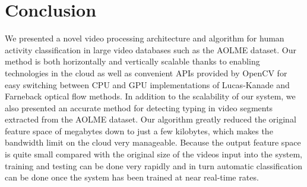\section{Conclusion}
We presented a novel video processing architecture and algorithm for human
activity classification in large video databases such as the AOLME dataset. Our
method is both horizontally and vertically scalable thanks to enabling
technologies in the cloud as well as convenient APIs provided by OpenCV for easy
switching between CPU and GPU implementations of Lucas-Kanade and Farneback
optical flow methods. In addition to the scalability of our system, we also
presented an accurate method for detecting typing in video segments extracted
from the AOLME dataset. Our algorithm greatly reduced the original feature space
of megabytes down to just a few kilobytes, which makes the bandwidth limit on
the cloud very manageable. Because the output feature space is quite small
compared with the original size of the videos input into the system, training
and testing can be done very rapidly and in turn automatic classification can be
done once the system has been trained at near real-time rates.
